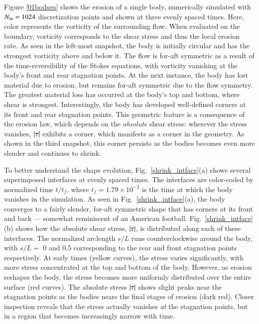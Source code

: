 \documentclass[preprint, 10pt]{elsarticle}
\begin{document}
Figure \ref{01bodseq} shows the erosion of a single body, numerically simulated with $N_{\mathrm{in}} = 1024$ discretization points and shown at three evenly spaced times. Here, color represents the vorticity of the surrounding flow. When evaluated on the boundary, vorticity corresponds to the shear stress and thus the local erosion rate. As seen in the left-most snapshot, the body is initially circular and has the strongest vorticity above and below it. The flow is for-aft symmetric as a result of the time-reversibility of the Stokes equations, with vorticity vanishing at the body's front and rear stagnation points. 
At the next instance, the body has lost material due to erosion, but remains for-aft symmetric due to the flow symmetry. The greatest material loss has occurred at the body's top and bottom, where shear is strongest. Interestingly, the body has developed well-defined corners at its front and rear stagnation points. This geometric feature is a consequence of the erosion law, which depends on the {\em absolute} shear stress: wherever the stress vanishes, $\lvert \tau \rvert$ exhibits a corner, which manifests as a corner in the geometry. As shown in the third snapshot, this corner persists as the bodies becomes even more slender and continues to shrink.

To better understand the shape evolution, Fig.~\ref{shrink_intface}(a) shows several superimposed interfaces at evenly spaced times. The interfaces are color-coded by normalized time $t/t_f$, where $t_f = 1.79 \times 10^{-2}$ is the time at which the body vanishes in the simulation. As seen in Fig.~\ref{shrink_intface}(a), the body converges to a fairly slender, for-aft symmetric shape that has corners at its front and back --- somewhat reminiscent of an American football.
Fig.~\ref{shrink_intface}(b) shows how the absolute shear stress, $\lvert \tau \rvert$, is distributed along each of these interfaces. The normalized arclength $s/L$ runs counterclockwise around the body, with $s/L = $ 0 and 0.5 corresponding to the rear and front stagnation points respectively. At early times (yellow curves), the stress varies significantly, with more stress concentrated at the top and bottom of the body. However, as erosion reshapes the body, the stress becomes more uniformly distributed over the entire surface (red curves). The absolute stress $\lvert \tau \rvert$ shows slight peaks near the stagnation points as the bodies nears the final stages of erosion (dark red). Closer inspection reveals that the stress actually vanishes {\em at} the stagnation points, but in a region that becomes increasingly narrow with time.
\end{document}
